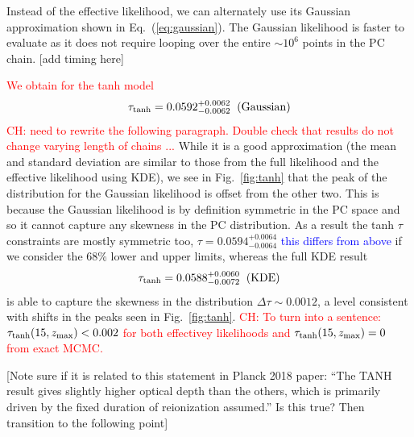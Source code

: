 \documentclass[prd,twocolumn,amsmath,amssymb,floatfix,superscriptaddress,nofootinbib]{revtex4-1}
\newcommand{\zmax}{z_{\rm max}}
\newcommand{\beq}{\begin{equation}}
\newcommand{\eeq}{\end{equation}}
\newcommand{\wh}[1]{\textcolor{blue}{#1}}
\newcommand{\ch}[1]{\textcolor{red}{#1}}
\begin{document}
Instead of the effective likelihood, we can alternately use its Gaussian approximation shown in Eq.~(\ref{eq:gaussian}). The Gaussian likelihood is faster to evaluate as it does not require looping over the entire $\sim 10^6$ points in the PC chain. [add timing here]

\ch{
We obtain for the tanh model 
\beq
\tau_{\rm tanh} = 0.0592_{-0.0062}^{+0.0062}\;\; (\mathrm{Gaussian})
\eeq
}
\ch{CH: need to rewrite the following paragraph. Double check that results do not change varying length of chains ...}
 While it is a good approximation (the mean and standard deviation are similar to those from the full likelihood and the effective likelihood using KDE), we see in Fig.~\ref{fig:tanh} that the peak of the distribution for the Gaussian likelihood is offset from the other two. This is because the Gaussian likelihood is by definition symmetric in the PC space and so it cannot capture any skewness in the PC distribution. As a result the tanh $\tau$ constraints are mostly symmetric too, $\tau = 0.0594_{-0.0064}^{+0.0064}$ \wh{this differs from above}
 if we consider the 68\% lower and upper limits, whereas the full KDE result 
\beq
\tau_{\rm tanh} = 0.0588_{-0.0072}^{+0.0060}\;\; (\mathrm{KDE})
\eeq
is able to capture the skewness in the distribution
$\Delta \tau \sim 0.0012$, a level consistent with shifts in the peaks seen in Fig.~\ref{fig:tanh}. \ch{CH: To turn into a sentence: $\tau_{\rm tanh}(15,\zmax) < 0.002$ for both effectivey likelihoods and $\tau_{\rm tanh}(15,\zmax) = 0$ from exact MCMC.}


[Note sure if it is related to this statement in Planck 2018 paper: ``The TANH result gives slightly higher optical  depth  than  the  others,  which  is  primarily driven  by  the  fixed  duration  of  reionization assumed.” Is this true? Then transition to the following point]
\end{document}
